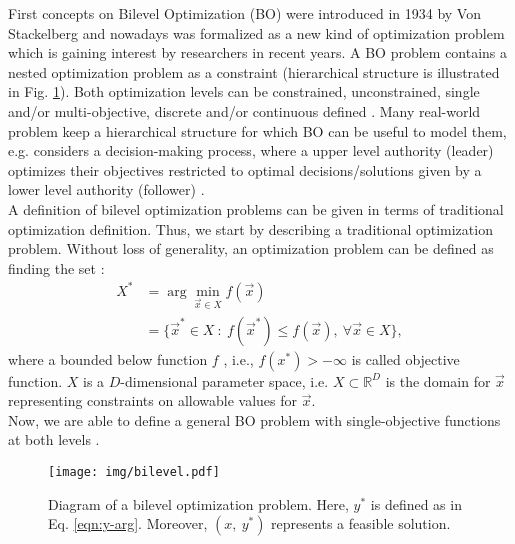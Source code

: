 \documentclass[conference]{IEEEtran}
\theoremstyle{definition}
\begin{document}
First concepts on Bilevel Optimization (BO) were introduced in 1934 by Von Stackelberg
\cite{von2010market}  and nowadays was formalized as a new kind of optimization
problem which is gaining interest by researchers in recent years. A BO problem
contains a nested optimization problem as a constraint (hierarchical structure is
illustrated in Fig. \ref{fig:bilevel}). Both optimization levels can be constrained,
unconstrained, single and/or multi-objective, discrete and/or continuous defined
\cite{bard2013practical,dempe2002foundations}. Many real-world problem keep a
hierarchical structure for which BO can be useful to model them, e.g. considers
a decision-making process, where a upper level authority (leader) optimizes their
objectives restricted to optimal decisions/solutions given by a  lower level authority (follower)
\cite{brotcorne2001bilevel,kalashnikov2010comparison,sinha2015transportation,von1945theory,wang2014bilevel}.\\

A definition of bilevel optimization problems can be given in terms of traditional
optimization definition. Thus, we start by describing a traditional optimization
problem. Without loss of generality, an optimization problem can be defined as
finding the set \cite{chong2013introduction,rao2009engineering}:
% 
\begin{align}
    \label{eqn:Xargmin}
    X^* &= \arg \min_{\vec{x} \in X} f(\vec{x}) \\ \nonumber
    &= \{ \vec{x}^* \in X \ : \ f(\vec{x}^*) \leq f( \vec{x} ), \ 
    \forall
    \vec{x} \in X \},
\end{align}
% 
where a bounded below function $f$ , i.e., $f(x^*)> -\infty$ is called objective
function. $X$ is a $D$-dimensional parameter space, i.e. $X \subset \mathbb{R}^D$
is the domain for $\vec{x}$ representing constraints on
allowable values for $\vec{x}$.\\

Now, we are able to define a general BO problem with
single-objective functions at both levels
\cite{bard2013practical,dempe2002foundations}.%

\begin{figure}[!ht]
    \centering
    \texttt{[image: img/bilevel.pdf]}
    \caption{Diagram of a bilevel optimization problem. Here, $y^*$ 
            is defined as in Eq. \ref{eqn:y-arg}. Moreover, $(x,\ y^*)$
            represents a feasible solution.}
    \label{fig:bilevel}
\end{figure}
% 
\end{document}
